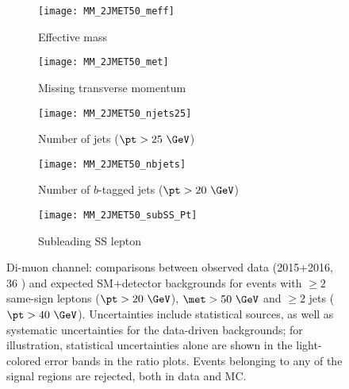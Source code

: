 \begin{figure}[t!]
\centering
\begin{subfigure}[t]{0.48\textwidth}
\texttt{[image: MM\_2JMET50\_meff]}
\caption{Effective mass \meff}
\end{subfigure}
\begin{subfigure}[t]{0.48\textwidth}
\texttt{[image: MM\_2JMET50\_met]}
\caption{Missing transverse momentum \met}
\end{subfigure}
\begin{subfigure}[t]{0.48\textwidth}
\texttt{[image: MM\_2JMET50\_njets25]}
\caption{Number of jets ($\pt>25~\GeV$)}
\end{subfigure}
\begin{subfigure}[t]{0.48\textwidth}
\texttt{[image: MM\_2JMET50\_nbjets]}
\caption{Number of $b$-tagged jets ($\pt>20~\GeV$)}
\end{subfigure}
\begin{subfigure}[t]{0.48\textwidth}
\texttt{[image: MM\_2JMET50\_subSS\_Pt]}
\caption{Subleading SS lepton \pt}
\end{subfigure}
\caption{Di-muon channel: comparisons between observed data (2015+2016, 36 \ifb) and expected SM+detector backgrounds 
for events with $\ge 2$ same-sign leptons ($\pt>20~\GeV$), $\met>50~\GeV$ and $\ge 2$ jets ($\pt>40~\GeV$). 
Uncertainties include statistical sources, as well as systematic uncertainties for the data-driven backgrounds; 
for illustration, statistical uncertainties alone are shown in the light-colored error bands in the ratio plots. 
Events belonging to any of the signal regions are rejected, both in data and MC.  
}
\label{fig:distributions_channelMM_2015}
\end{figure} 

